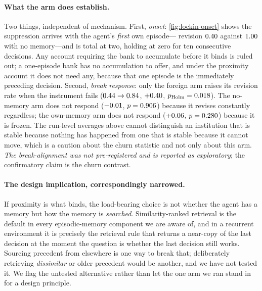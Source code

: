 \documentclass[11pt]{article}
\begin{document}
\paragraph{What the arm does establish.} Two things, independent of mechanism. First, \emph{onset}:
\cref{fig:lockin-onset} shows the suppression arrives with the agent's \emph{first} own episode---
revision $0.40$ against $1.00$ with no memory---and is total at two, holding
at zero for ten consecutive decisions. Any account requiring the bank to accumulate before it binds
is ruled out; a one-episode bank has no accumulation to offer, and under the proximity account it
does not need any, because that one episode is the immediately preceding decision. Second,
\emph{break response}: only the foreign arm raises its revision rate when the instrument fails
($0.44 \to 0.84$, $+0.40$,
$p_{\text{Holm}} = 0.018$). The no-memory arm does not respond
($-0.01$, $p = 0.906$) because it revises constantly regardless; the own-memory arm
does not respond ($+0.06$, $p = 0.280$) because it is frozen. The run-level averages
above cannot distinguish an institution that is stable because nothing has happened from one that is
stable because it cannot move, which is a caution about the churn statistic and not only about this
arm. \emph{The break-alignment was not pre-registered and is reported as exploratory}; the
confirmatory claim is the churn contrast.

\paragraph{The design implication, correspondingly narrowed.} If proximity is what binds, the
load-bearing choice is not whether the agent has a memory but how the memory is \emph{searched}.
Similarity-ranked retrieval is the default in every episodic-memory component we are aware of, and in
a recurrent environment it is precisely the retrieval rule that returns a near-copy of the last
decision at the moment the question is whether the last decision still works. Sourcing precedent from
elsewhere is one way to break that; deliberately retrieving \emph{dissimilar} or older precedent
would be another, and we have not tested it. We flag the untested alternative rather than let the
one arm we ran stand in for a design principle.
\end{document}
